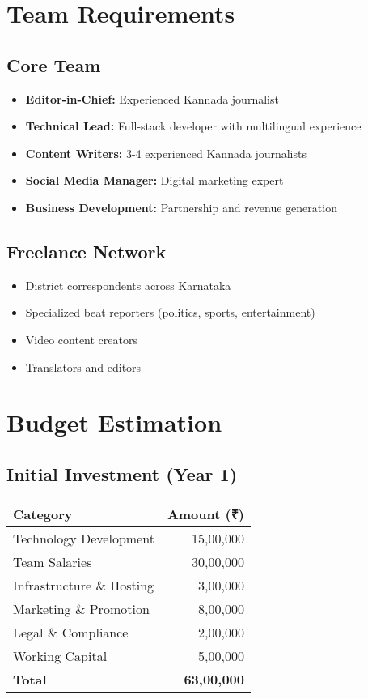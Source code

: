 \documentclass[11pt,a4paper]{article}
\begin{document}
\section{Team Requirements}

\subsection{Core Team}
\begin{itemize}[leftmargin=2em]
    \item \textbf{Editor-in-Chief:} Experienced Kannada journalist
    \item \textbf{Technical Lead:} Full-stack developer with multilingual experience
    \item \textbf{Content Writers:} 3-4 experienced Kannada journalists
    \item \textbf{Social Media Manager:} Digital marketing expert
    \item \textbf{Business Development:} Partnership and revenue generation
\end{itemize}

\subsection{Freelance Network}
\begin{itemize}[leftmargin=2em]
    \item District correspondents across Karnataka
    \item Specialized beat reporters (politics, sports, entertainment)
    \item Video content creators
    \item Translators and editors
\end{itemize}

\section{Budget Estimation}

\subsection{Initial Investment (Year 1)}
\begin{center}
\begin{tabular}{lr}
\toprule
\textbf{Category} & \textbf{Amount (₹)} \\
\midrule
Technology Development & 15,00,000 \\
Team Salaries & 30,00,000 \\
Infrastructure \& Hosting & 3,00,000 \\
Marketing \& Promotion & 8,00,000 \\
Legal \& Compliance & 2,00,000 \\
Working Capital & 5,00,000 \\
\midrule
\textbf{Total} & \textbf{63,00,000} \\
\bottomrule
\end{tabular}
\end{center}
\end{document}
